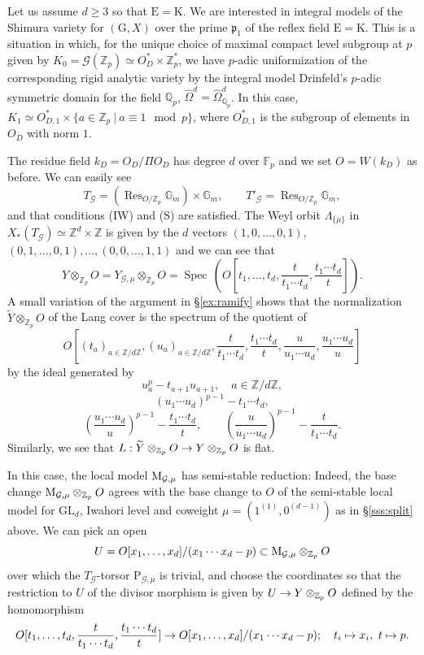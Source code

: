 \documentclass[reqno, 10pt]{amsart}
\makeatletter
\newcommand{\fkp}{\ensuremath{\mathfrak{p}}\xspace}
\newcommand{\BF}{\ensuremath{\mathbb {F}}\xspace}
\newcommand{\BG}{\ensuremath{\mathbb {G}}\xspace}
\newcommand{\BQ}{\ensuremath{\mathbb {Q}}\xspace}
\newcommand{\BZ}{\ensuremath{\mathbb {Z}}\xspace}
\newcommand{\CG}{\ensuremath{\mathcal {G}}\xspace}
\newcommand{\RE}{\ensuremath{\mathrm {E}}\xspace}
\newcommand{\RG}{\ensuremath{\mathrm {G}}\xspace}
\newcommand{\RK}{\ensuremath{\mathrm {K}}\xspace}
\newcommand{\RP}{\ensuremath{\mathrm {P}}\xspace}
\newcommand{\GL}{\mathrm{GL}}
\DeclareMathOperator{\Res}{Res}
\DeclareMathOperator{\Spec}{Spec\,}
\newcommand{\wt}{\widetilde}
\newcommand{\wh}{\widehat}
\theoremstyle{definition}
\numberwithin{equation}{subsection}
\numberwithin{subsubsection}{subsection}
\renewcommand{\to}{%
   \ifbool{@display}{\longrightarrow}{\rightarrow}%
   }
\let\shortmapsto\mapsto
\renewcommand{\mapsto}{%
   \ifbool{@display}{\shortmapsto}{\shortmapsto}%
   }
\newcommand{\Mloc}{{\rm M}}
\makeatother
\begin{document}
  Let us assume $d\geq 3$ so that $\RE=\RK$.  We are interested in integral models of the Shimura variety for $(\RG, X)$ over the prime $\fkp_1$ of the reflex field $\RE=\RK$. This is a situation in which, for the unique choice of maximal compact level subgroup at $p$ given by $K_0=\CG(\BZ_p)\simeq O_D^*\times\BZ_p^*$, we have $p$-adic uniformization of the corresponding rigid analytic variety by the integral model Drinfeld's $p$-adic symmetric domain for the field $\BQ_p$, $\wh \Omega^d=\wh \Omega^d_{\BQ_p}$. In this case, $K_1\simeq O^*_{D,1}\times \{a\in \BZ_p\ |\ a\equiv 1\mod p\}$, where $O_{D,1}^*$ is the subgroup of elements in $O_D$ with norm $1$.
 
The residue field $k_D=O_D/\Pi O_D$ has degree $d$ over $\BF_p$ and we set  $O=W(k_D)$ as before.
We can easily see   
 \[
 T_\CG=(\Res_{O/\BZ_p}\BG_m)\times\BG_m,\qquad T'_\CG=\Res_{O/\BZ_p}\BG_m,
 \]
 and that conditions (IW) and (S) are satisfied.
The Weyl orbit $\Lambda_{\{\mu\}}$   in $X_*(T_\CG)\simeq \BZ^d\times\BZ$ is given by the $d$ vectors $(1,0,\ldots, 0,1)$, $(0,1,\ldots, 0,1),\ldots, (0,0,\ldots, 1,1)$ and we can see that 
\[
Y\otimes_{\BZ_p} O=Y_{\CG,\mu}\otimes_{\BZ_p} O=\Spec(O[t_1,\ldots, t_d, \frac{t}{t_1\cdots t_d}, \frac{t_1\cdots t_d}{t}]).
\]
A small variation of the argument in \S \ref{ex:ramify} shows that the normalization $\wt Y\otimes_{\BZ_p} O$ of the Lang cover is the spectrum of the quotient of
\[
 O[(t_a)_{a\in \BZ/d\BZ},  (u_a)_{a\in \BZ/d\BZ}, \frac{t}{t_1\cdots t_d}, \frac{t_1\cdots t_d}{t}, 
 \frac{u}{u_1\cdots u_d}, \frac{u_1\cdots u_d}{u}]
\]
by the ideal generated by
\[
u_a^p-t_{a+1}u_{a+1}, \quad a\in \BZ/d\BZ,
\]
\[
(u_1\cdots u_d)^{p-1}-t_1\cdots t_d, 
\]
\[
   \left(\frac{u_1\cdots u_d}{u}\right)^{p-1}-\frac{t_1\cdots t_d}{t}, \qquad  \left(\frac{u}{u_1\cdots u_d}\right)^{p-1}-\frac{t}{t_1\cdots t_d}.
\]
Similarly, we see that $L: \wt Y\otimes_{\BZ_p} O\to Y\otimes_{\BZ_p}O$ is flat.

In this case, the local model $\Mloc_{\CG,\mu}$ has semi-stable reduction: 
Indeed, the base change $\Mloc_{\CG,\mu}\otimes_{\BZ_p}O$ agrees with the base change to $O$ of the semi-stable local model for $\GL_d$, Iwahori level and   coweight $\mu=(1^{(1)}, 0^{(d-1)})$ as in \S \ref{sss:split} above.
We can pick an open 
\[
U=O[x_1, \ldots , x_d]/(x_1\cdots x_d-p)\subset \Mloc_{\CG,\mu}\otimes_{\BZ_p}O
\]
over which the $T_\CG$-torsor $\RP_{\CG,\mu}$ is trivial, and choose the coordinates so that the restriction to $U$ of the divisor morphism  is given by
$U\to Y\otimes_{\BZ_p} O $ defined by the homomorphism
\[
O[t_1,\ldots, t_d, \frac{t}{t_1\cdots t_d}, \frac{t_1\cdots t_d}{t}] \to O[x_1, \ldots , x_d]/(x_1\cdots x_d-p); \quad t_i\mapsto x_i, \ t\mapsto p.
\]
 
\end{document}
